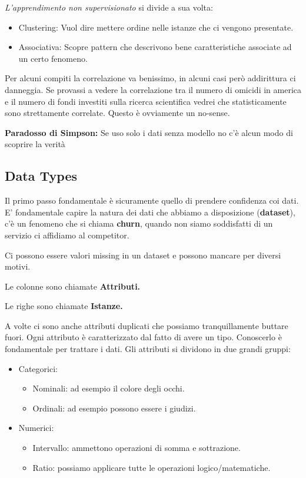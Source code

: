 \documentclass[12pt, a4paper,titlepage,openany]{article}
\begin{document}
\textit{L'apprendimento non supervisionato} si divide a sua volta:
\begin{itemize}
	\item Clustering: Vuol dire mettere ordine nelle istanze che ci vengono presentate.
	\item Associativa: Scopre pattern che descrivono bene caratteristiche associate ad un certo fenomeno.
\end{itemize}

Per alcuni compiti la correlazione va benissimo, in alcuni casi però addirittura ci danneggia. Se provassi a vedere la correlazione tra il numero di omicidi in america e il numero di fondi investiti sulla ricerca scientifica vedrei che statisticamente sono strettamente correlate. Questo è ovviamente un no-sense.

\textbf{Paradosso di Simpson:} Se uso solo i dati senza modello no c'è alcun modo di scoprire la verità


\subsection{Data Types}

Il primo passo fondamentale è sicuramente quello di prendere confidenza coi dati. E' fondamentale capire la natura dei dati che abbiamo a disposizione (\textbf{dataset}), c'è un fenomeno che si chiama \textbf{churn}, quando non siamo soddisfatti di un servizio ci affidiamo al competitor.

Ci possono essere valori missing in un dataset e possono mancare per diversi motivi.

Le colonne sono chiamate \textbf{Attributi.}

Le righe sono chiamate \textbf{Istanze.}

A volte ci sono anche attributi duplicati che possiamo tranquillamente buttare fuori.
Ogni attributo è caratterizzato dal fatto di avere un tipo. Conoscerlo è fondamentale per trattare i dati.
Gli attributi si dividono in due grandi gruppi:
\begin{itemize}
	\item Categorici:
	\begin{itemize}
		\item Nominali: ad esempio il colore degli occhi.
		\item Ordinali: ad esempio possono essere i giudizi.
	\end{itemize}
	\item Numerici:
	\begin{itemize}
		\item Intervallo: ammettono operazioni di somma e sottrazione. 
		\item Ratio: possiamo applicare tutte le operazioni logico/matematiche.
	\end{itemize}
\end{itemize}
\end{document}
